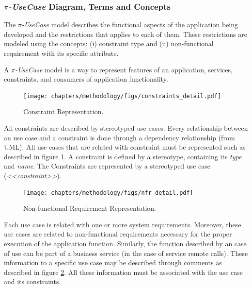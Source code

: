  \subsubsection{\textit{$\pi$-UseCase} Diagram, Terms and Concepts} 
  

The \textit{$\pi$-UseCase} model describes the
functional aspects of the application being developed and the restrictions
that applies to each of them. These restrictions are modeled using the concepts:
(i) constraint type and (ii) non-functional requirement with its
specific attribute.


 A \textit{$\pi$-UseCase} model is a way to represent features of an
 application, services, constraints, and consumers of application functionality.
 
%   

 \begin{figure}[ht!] 
\centering
\texttt{[image: chapters/methodology/figs/constraints\_detail.pdf]}
\caption{Constraint Representation.}
\label{fig:constraint_detail} 
\end{figure}

 All constraints are described by stereotyped use cases. Every relationship
 between an use case and a constraint is done through a dependency relationship
 (from UML). All use cases that are related with constraint must be
 represented such as described in figure \ref{fig:constraint_detail}. A
 constraint is defined by a stereotype, containing its \textit{type} and
 \textit{name}. The {\sc Constraints} are represented by a stereotyped use case
(\textit{<<constraint>>}).

 \begin{figure}[ht!] 
\centering
\texttt{[image: chapters/methodology/figs/nfr\_detail.pdf]}
\caption{Non-functional Requirement Representation.}
\label{fig:nfr_detail} 
\end{figure}

Each use case is related with one or more system requirements. Moreover, these
use cases are related to non-functional requirements necessary for the proper
execution of the application function. Similarly, the function described by an
case of use can be part of a business service (in the case of service remote
calls). These information to a specific use case may be described through
comments as described in figure \ref{fig:nfr_detail}. All these information
must be associated with the use case and its constraints.
 
